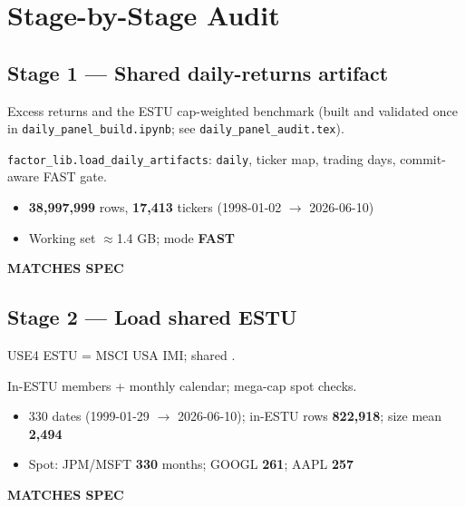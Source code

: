 \documentclass[11pt,a4paper]{article}
\newcommand{\PASS}[1]{\textcolor{pass}{\textbf{#1}}}
\begin{document}
\section{Stage-by-Stage Audit}

\subsection{Stage 1 --- Shared daily-returns artifact}

\begin{description}[style=nextline]
  \item[PDF SPEC] Excess returns and the ESTU cap-weighted benchmark (built and validated once in \texttt{daily\_panel\_build.ipynb}; see \texttt{daily\_panel\_audit.tex}).
  \item[Implementation] \texttt{factor\_lib.load\_daily\_artifacts}: \texttt{daily}, ticker map, trading days, commit-aware FAST gate.
  \item[Observed]\phantom{x}
    \begin{itemize}[nosep, topsep=-\parskip]
      \item \textbf{38{,}997{,}999} rows, \textbf{17{,}413} tickers (1998-01-02 $\to$ 2026-06-10)
      \item Working set $\approx$1.4 GB; mode \textbf{FAST}
    \end{itemize}
  \item[Status] \PASS{MATCHES SPEC}
\end{description}

\subsection{Stage 2 --- Load shared ESTU}

\begin{description}[style=nextline]
  \item[PDF SPEC] USE4 ESTU = MSCI USA IMI; shared .
  \item[Implementation] In-ESTU members + monthly calendar; mega-cap spot checks.
  \item[Observed]\phantom{x}
    \begin{itemize}[nosep, topsep=-\parskip]
      \item 330 dates (1999-01-29 $\to$ 2026-06-10); in-ESTU rows \textbf{822{,}918}; size mean \textbf{2{,}494}
      \item Spot: JPM/MSFT \textbf{330} months; GOOGL \textbf{261}; AAPL \textbf{257}
    \end{itemize}
  \item[Status] \PASS{MATCHES SPEC}
\end{description}
\end{document}

